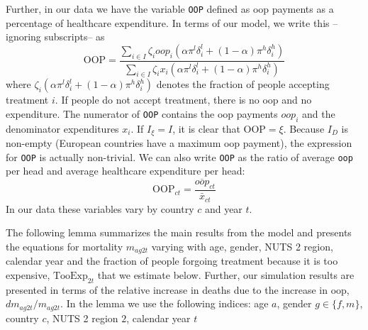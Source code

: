 \documentclass[a4paper,12pt]{article}
\begin{document}
Further, in our data we have the variable \texttt{OOP} defined as oop payments as a percentage of healthcare expenditure. In terms of our model, we write this --ignoring subscripts-- as
\begin{equation}
\label{eq:OOP}
\text{OOP} = \frac{\sum_{i \in I} \zeta_i oop_i (\alpha \pi^l \delta^l_i + (1-\alpha) \pi^h \delta^h_i)}{\sum_{i \in I} \zeta_i x_i (\alpha \pi^l \delta_i^l + (1-\alpha) \pi^h \delta_i^h) }
\end{equation}
where \(\zeta_i (\alpha \pi^l \delta^l_i + (1-\alpha) \pi^h \delta^h_i)\) denotes the fraction of people accepting treatment \(i\). If people do not accept treatment, there is no oop and no expenditure. The numerator of \texttt{OOP} contains the oop payments \(oop_{i}\) and the denominator expenditures \(x_i\). If \(I_{\xi} = I\), it is clear that \(\text{OOP} = \xi\). Because \(I_D\) is non-empty (European countries have a maximum oop payment), the expression for \texttt{OOP} is actually non-trivial. We can also write \texttt{OOP} as the ratio of average \texttt{oop} per head and average healthcare expenditure per head:
\begin{equation}
\label{eq:OOP2}
\text{OOP}_{ct} = \frac{\overline{oop}_{ct}}{\bar{x}_{ct}}
\end{equation}
In our data these variables vary by country \(c\) and year \(t\).

The following lemma summarizes the main results from the model and presents the equations for mortality \(m_{ag2t}\) varying with age, gender, NUTS 2 region, calendar year and the fraction of people forgoing treatment because it is too expensive, \(\text{TooExp}_{2t}\) that we estimate below. Further, our simulation results are presented in terms of the relative increase in deaths due to the increase in oop, \(dm_{ag2t}/m_{ag2t}\). In the lemma we use the following indices: age \(a\), gender \(g \in \{f,m\}\), country \(c\), NUTS 2 region \(2\), calendar year \(t\)
\end{document}
